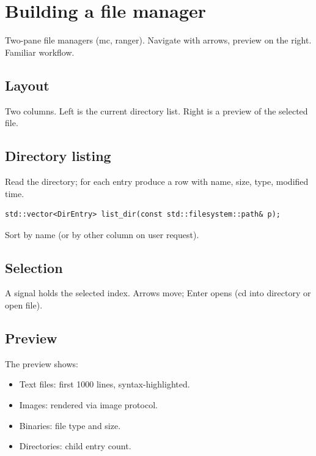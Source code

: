 \chapter{Building a file manager}
\label{ch:filemgr}

\begin{aside}
Two-pane file managers (mc, ranger). Navigate with arrows,
preview on the right. Familiar workflow.
\end{aside}

\section{Layout}

Two columns. Left is the current directory list. Right is
a preview of the selected file.

\section{Directory listing}

Read the directory; for each entry produce a row with
name, size, type, modified time.

\begin{lstlisting}
std::vector<DirEntry> list_dir(const std::filesystem::path& p);
\end{lstlisting}

Sort by name (or by other column on user request).

\section{Selection}

A signal holds the selected index. Arrows move; Enter
opens (cd into directory or open file).

\section{Preview}

The preview shows:

\begin{itemize}[leftmargin=*]
  \item Text files: first 1000 lines, syntax-highlighted.
  \item Images: rendered via image protocol.
  \item Binaries: file type and size.
  \item Directories: child entry count.
\end{itemize}

